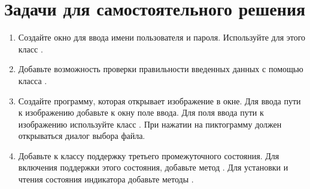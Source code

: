 \section{Задачи для самостоятельного решения}
\begin{enumerate}
\item Создайте окно для ввода имени пользователя и пароля. Используйте для этого класс .
\item Добавьте возможность проверки правильности введенных данных с помощью класса . 
\item Создайте программу, которая открывает изображение в окне. Для ввода пути к изображению добавьте к окну поле ввода.
Для поля ввода пути к изображению используйте класс . При нажатии на пиктограмму должен открываться
диалог выбора файла.
\item Добавьте к классу  поддержку третьего промежуточного состояния. Для включения поддержки этого
состояния, добавьте метод . Для установки и чтения состояния индикатора добавьте методы .
\end{enumerate}
